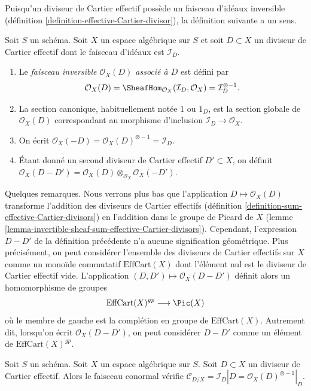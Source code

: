 \noindent
Puisqu'un diviseur de Cartier effectif possède un faisceau d'idéaux inversible
(définition \ref{definition-effective-Cartier-divisor}), la
définition suivante a un sens.

\begin{definition}
\label{definition-invertible-sheaf-effective-Cartier-divisor}
Soit $S$ un schéma. Soit $X$ un espace algébrique sur $S$
et soit $D \subset X$ un diviseur de Cartier effectif dont le faisceau
d'idéaux est $\mathcal{I}_D$.
\begin{enumerate}
\item Le {\it faisceau inversible $\mathcal{O}_X(D)$ associé à $D$}
est défini par
$$
\mathcal{O}_X(D) =
\SheafHom_{\mathcal{O}_X}(\mathcal{I}_D, \mathcal{O}_X) =
\mathcal{I}_D^{\otimes -1}.
$$
\item La section canonique, habituellement notée $1$ ou $1_D$, est la
section globale de $\mathcal{O}_X(D)$ correspondant au
morphisme d'inclusion $\mathcal{I}_D \to \mathcal{O}_X$.
\item On écrit
$\mathcal{O}_X(-D) = \mathcal{O}_X(D)^{\otimes -1} = \mathcal{I}_D$.
\item Étant donné un second diviseur de Cartier effectif $D' \subset X$, on définit
$\mathcal{O}_X(D - D') =
\mathcal{O}_X(D) \otimes_{\mathcal{O}_X} \mathcal{O}_X(-D')$.
\end{enumerate}
\end{definition}

\noindent
Quelques remarques. Nous verrons plus bas que l'application
$D \mapsto \mathcal{O}_X(D)$ transforme l'addition des diviseurs de Cartier
effectifs (définition \ref{definition-sum-effective-Cartier-divisors})
en l'addition dans le groupe de Picard de $X$
(lemme \ref{lemma-invertible-sheaf-sum-effective-Cartier-divisors}).
Cependant, l'expression $D - D'$ de la définition précédente n'a
aucune signification géométrique. Plus précisément, on peut considérer
l'ensemble des diviseurs de Cartier effectifs sur $X$ comme un monoïde commutatif
$\text{EffCart}(X)$ dont l'élément nul est le diviseur de Cartier effectif vide.
L'application $(D, D') \mapsto \mathcal{O}_X(D - D')$ définit alors
un homomorphisme de groupes
$$
\text{EffCart}(X)^{gp} \longrightarrow \Pic(X)
$$
où le membre de gauche est la complétion en groupe de
$\text{EffCart}(X)$. Autrement dit, lorsqu'on écrit $\mathcal{O}_X(D - D')$,
on peut considérer $D - D'$ comme un élément de $\text{EffCart}(X)^{gp}$.

\begin{lemma}
\label{lemma-conormal-effective-Cartier-divisor}
Soit $S$ un schéma. Soit $X$ un espace algébrique sur $S$.
Soit $D \subset X$ un diviseur de Cartier effectif.
Alors le faisceau conormal vérifie $\mathcal{C}_{D/X} = \mathcal{I}_D|D =
\mathcal{O}_X(D)^{\otimes -1}|_D$.
\end{lemma}

